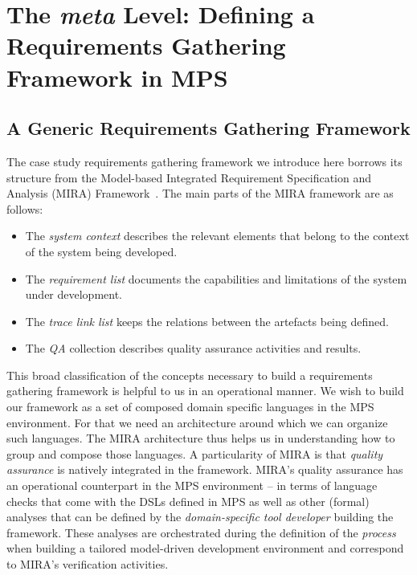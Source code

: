 \section{The \emph{meta} Level: Defining a Requirements Gathering Framework in
MPS}
\label{sec:meta}
\vspace{-.3cm}
\subsection{A Generic Requirements Gathering Framework}
\label{sec:generic_req_fram}
\vspace{-.3cm}
The case study requirements gathering framework we introduce here borrows its
structure from the Model-based Integrated Requirement Specification and Analysis (MIRA)
Framework~\cite{MIRA13,AF315}. The main parts of the MIRA framework are
as follows:
\vspace{-.1cm}
\begin{itemize}
  \item The \emph{system context} describes the relevant elements that belong
  to the context of the system being developed.
  \item The \emph{requirement list} documents the capabilities and limitations
  of the system under development.
  \item The \emph{trace link list} keeps the relations between the artefacts
  being defined.
  \item The \emph{QA} collection describes quality assurance activities and
  results.
\end{itemize}
\vspace{-.1cm}
This broad classification of the concepts necessary to build a requirements
gathering framework is helpful to us in an operational manner. We wish to build
our framework as a set of composed domain specific languages in the MPS
environment. For that we need an architecture around which we can organize such
languages. The MIRA architecture thus helps us in understanding how to group and
compose those languages. A particularity of MIRA is that \emph{quality
assurance} is natively integrated in the framework. MIRA's quality assurance
has an operational counterpart in the MPS environment -- in terms of
language checks that come with the DSLs defined in MPS as well as other (formal)
analyses that can be defined by the \emph{domain-specific tool developer}
building the framework. These analyses are orchestrated during the definition of
the \emph{process} when building a tailored model-driven development environment
and correspond to MIRA's verification activities.\vspace{-.8cm}
